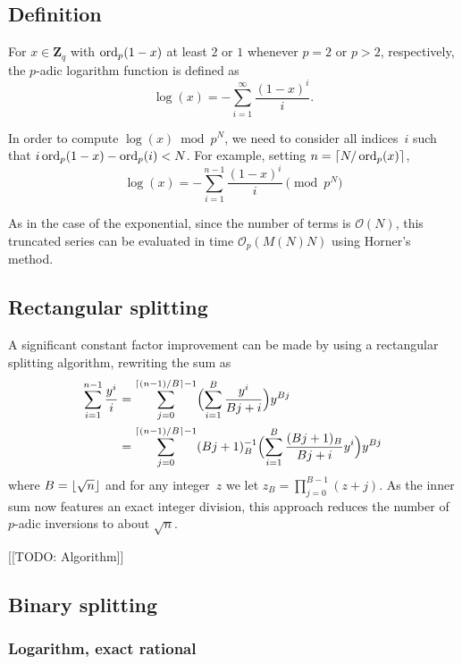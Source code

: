 \subsection{Definition}

For $x \in \mathbf{Z}_q$ with $\operatorname{ord}_p(1 - x)$ at least $2$ or $1$ 
whenever $p = 2$ or $p > 2$, respectively, the $p$-adic logarithm 
function is defined as 
\begin{equation}
\log(x) = - \sum_{i=1}^{\infty} \frac{(1-x)^i}{i}.
\end{equation}

In order to compute $\log(x) \bmod p^N$, we need to consider all 
indices~$i$ such that $i \operatorname{ord}_p(1-x) - \operatorname{ord}_p(i) < N$.  For example, 
setting $n = \left\lceil N/\operatorname{ord}_p(x)\right\rceil$, 
\begin{equation*}
\log(x) = - \sum_{i=1}^{n-1} \frac{(1-x)^i}{i} \pmod{p^N}
\end{equation*}

As in the case of the exponential, since the number of terms 
is $\mathcal{O}(N)$, this truncated series can be evaluated 
in time $\mathcal{O}_p(M(N) N)$ using Horner's method.

\subsection{Rectangular splitting}

A significant constant factor improvement can be made by using 
a rectangular splitting algorithm, rewriting the sum as 
\begin{align}
\sum_{i=1}^{n-1} \frac{y^i}{i}
& = \sum_{j=0}^{\left\lceil(n-1)/B\right\rceil - 1} \Bigl( \sum_{i=1}^B \frac{y^i}{Bj + i} \Bigr) y^{Bj} \\
& = \sum_{j=0}^{\left\lceil(n-1)/B\right\rceil - 1} (Bj+1)_B^{-1} \Bigl( \sum_{i=1}^B \frac{(Bj+1)_B}{Bj + i} y^i \Bigr) y^{Bj}
\end{align}
where $B = \left\lfloor\sqrt{n}\right\rfloor$ and for any integer~$z$ 
we let $z_B = \prod_{j=0}^{B-1} (z + j)$.  As the inner 
sum now features an exact integer division, this approach 
reduces the number of $p$-adic inversions to about $\sqrt{n}$.

[[TODO:  Algorithm]]

\subsection{Binary splitting}

\subsubsection{Logarithm, exact rational}

